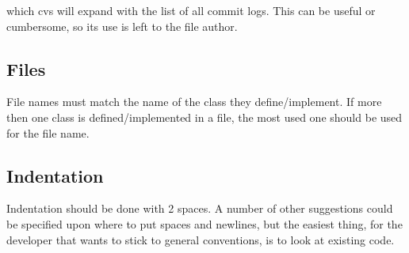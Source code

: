 \noindent{}


which cvs will expand with the list of all commit logs.
This can be useful or cumbersome, so its use is left to the file author.


\subsection{Files}

File names must match the name of the class they define/implement.
If more then one class is defined/implemented in a file, the most used one should be used for the file name.


\subsection{Indentation}

Indentation should be done with 2 spaces. 
A number of other suggestions could be specified upon where to put spaces and newlines, 
but the easiest thing, for the developer that wants to stick to general conventions, is to look at existing code.
